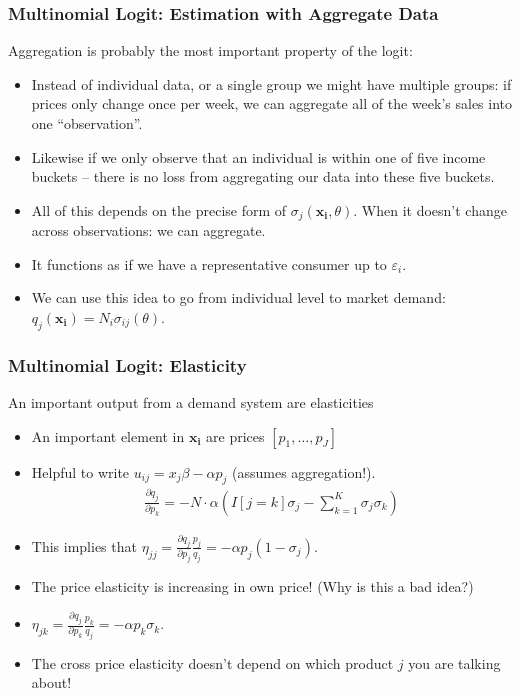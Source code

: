 \documentclass[aspectratio=169,11pt]{beamer}
\begin{document}
\begin{frame}
\frametitle{Multinomial Logit: Estimation with Aggregate Data}
\alert{Aggregation} is probably the most important property of the  logit:
\begin{itemize}
\item Instead of individual data, or a single group we might have multiple groups: if prices only change once per week, we can aggregate all of the week's sales into one ``observation''.
\item Likewise if we only observe that an individual is within one of five income buckets -- there is no loss from aggregating our data into these five buckets.
\item All of this depends on the precise form of $ \sigma_{j}(\symbf{x_i},\theta)$. When it doesn't change across observations: we can aggregate.
\item It functions as if we have a representative consumer up to $\varepsilon_{i}$.
\item We can use this idea to go from individual level to market demand: $q_j(\symbf{x_i}) = N_i \sigma_{ij}(\theta)$.
\end{itemize}
\end{frame}

\begin{frame}
\frametitle{Multinomial Logit: Elasticity}
An important output from a demand system are elasticities
\begin{itemize}
\item An important element in $\symbf{x_i}$ are prices $[p_{1},\ldots,p_J]$
\item Helpful to write $u_{ij} = x_j \beta -\alpha p_j$ (assumes aggregation!).
\begin{eqnarray*}
\frac{\partial q_j}{\partial p_k} =-N \cdot \alpha \left(I[j = k] \sigma_j -\sum_{k=1}^K \sigma_j \sigma_k \right)
\end{eqnarray*}
\item This implies that $ \eta_{jj} = \frac{\partial q_j}{\partial p_j} \frac{p_j}{q_j}  = -\alpha p_j (1-\sigma_j)$.
\item The price elasticity is increasing in own price! (Why is this a bad idea?)
\item  $ \eta_{jk} = \frac{\partial q_j}{\partial p_k} \frac{p_k}{q_j}  = -\alpha p_k \sigma_k$.
\item The cross price elasticity doesn't depend on which product $j$ you are talking about!
\end{itemize}
\end{frame}
\end{document}

